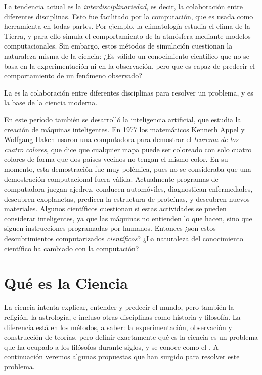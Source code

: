 La tendencia actual es la \emph{interdisciplinariedad}, es decir, la
colaboración entre diferentes disciplinas.
Esto fue facilitado por la computación, que es usada como herramienta en todas
partes.
Por ejemplo, la climatología estudia el clima de la Tierra, y para ello
simula el comportamiento de la atmósfera mediante modelos computacionales.
Sin embargo, estos métodos de simulación cuestionan la naturaleza misma de la
ciencia:
¿Es válido un conocimiento científico que no se basa en la experimentación ni
en la observación, pero que es capaz de predecir el comportamiento de un
fenómeno observado?

\begin{remember}
    \label{rem:interdisciplinariedad}
    La  es la colaboración entre diferentes
    disciplinas para resolver un problema, y es la base de la ciencia moderna.
\end{remember}

En este período también se desarrolló la inteligencia artificial, que
estudia la creación de máquinas inteligentes.
En 1977 los matemáticos Kenneth Appel y Wolfgang Haken usaron una computadora
para demostrar el \emph{teorema de los cuatro colores}, que dice que cualquier
mapa puede ser coloreado con solo cuatro colores de forma que dos países
vecinos no tengan el mismo color.
En su momento, esta demostración fue muy polémica, pues no se consideraba que
una demostración computacional fuera válida.
Actualmente programas de computadora juegan ajedrez, conducen automóviles,
diagnostican enfermedades, descubren exoplanetas, predicen la estructura de
proteínas, y descubren nuevos materiales.
Algunos científicos cuestionan si estas actividades se pueden considerar
inteligentes, ya que las máquinas no entienden lo que hacen, sino que siguen
instrucciones programadas por humanos.
Entonces ¿son estos descubrimientos computarizados \emph{científicos}?
¿La naturaleza del conocimiento científico ha cambiado con la computación?

\section{Qué es la Ciencia}
\label{sec:queeslaciencia}

La ciencia intenta explicar, entender y predecir el mundo, pero también la
religión, la astrología, e incluso otras disciplinas como historia y filosofía.
La diferencia está en los métodos, a saber: la experimentación, observación y
construcción de teorías, pero definir exactamente qué es la ciencia es un
problema que ha ocupado a los filósofos durante siglos, y se conoce como el
.
A continuación veremos algunas propuestas que han surgido para resolver este
problema.

